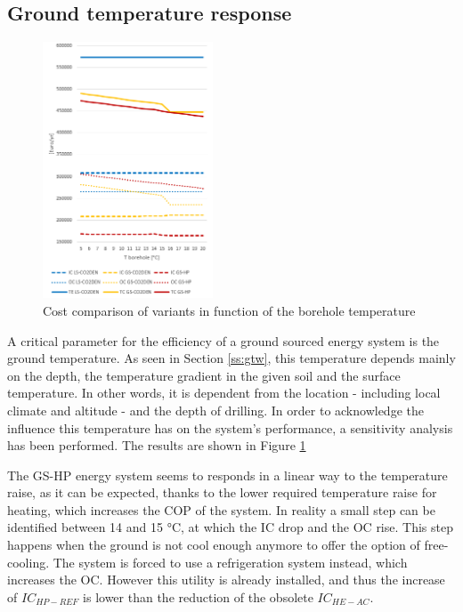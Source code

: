 \documentclass{article}
\begin{document}
\subsection{Ground temperature response}


\begin{figure} 
	\vspace{-20pt}
	\centering
	\includegraphics[width=0.45\textwidth]{V_SA_Tg.png}
	\caption{Cost comparison of variants in function of the borehole temperature}
	\label{fig:V_SA_Tg}
	\vspace{-10pt}
\end{figure}

A critical parameter for the efficiency of a ground sourced energy system is the ground temperature. As seen in Section \ref{ss:gtw}, this temperature depends mainly on the depth, the temperature gradient in the given soil and the surface temperature. In other words, it is dependent from the location - including local climate and altitude - and the depth of drilling. In order to acknowledge the influence this temperature has on the system's performance, a sensitivity analysis has been performed. The results are shown in Figure \ref{fig:V_SA_Tg}

The GS-HP energy system seems to responds in a linear way to the temperature raise, as it can be expected, thanks to the lower required temperature raise for heating, which increases the COP of the system. In reality a small step can be identified between 14 and 15 \si{\celsius}, at which the IC drop and the OC rise. This step happens when the ground is not cool enough anymore to offer the option of free-cooling. The system is forced to use a refrigeration system instead, which increases the OC. However this utility is already installed, and thus the increase of $IC_{HP-REF}$ is lower than the reduction of the obsolete $IC_{HE-AC}$.
\end{document}
